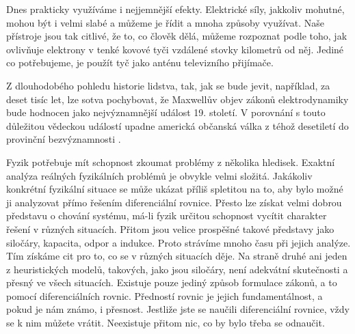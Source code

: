       Dnes prakticky využíváme i nejjemnější efekty. Elektrické síly, jakkoliv mohutné, mohou být i
      velmi slabé a můžeme je řídit a mnoha způsoby využívat. Naše přístroje jsou tak citlivé, že
      to, co člověk dělá, můžeme rozpoznat podle toho, jak ovlivňuje elektrony v tenké kovové tyči
      vzdálené stovky kilometrů od něj. Jediné co potřebujeme, je použít tyč jako anténu televizního
      přijímače.

      Z dlouhodobého pohledu historie lidstva, tak, jak se bude jevit, například, za deset tisíc
      let, lze sotva pochybovat, že Maxwellův objev zákonů elektrodynamiky bude hodnocen jako
      nejvýznamnější událost 19. století. V porovnání s touto důležitou vědeckou událostí upadne
      americká občanská válka z téhož desetiletí do provinční bezvýznamnosti
      \cite[s.~25]{Feynman02}.

  

    Fyzik potřebuje mít schopnost zkoumat problémy z několika hledisek. Exaktní analýza reálných
    fyzikálních problémů je obvykle velmi složitá. Jakákoliv konkrétní fyzikální situace se může
    ukázat příliš spletitou na to, aby bylo možné ji analyzovat přímo řešením diferenciální rovnice.
    Přesto lze získat velmi dobrou představu o chování systému, má-li fyzik určitou schopnost
    vycítit charakter řešení v různých situacích. Přitom jsou velice prospěšné takové představy jako
    siločáry, kapacita, odpor a indukce. Proto strávíme mnoho času při jejich analýze. Tím získáme
    cit pro to, co se v různých situacích děje. Na straně druhé ani jeden z heuristických modelů,
    takových, jako jsou siločáry, není adekvátní skutečnosti a přesný ve všech situacích. Existuje
    pouze jediný způsob formulace zákonů, a to pomocí diferenciálních rovnic. Předností rovnic je
    jejich fundamentálnost, a pokud je nám známo, i přesnost. Jestliže jste se naučili diferenciální
    rovnice, vždy se k nim můžete vrátit. Neexistuje přitom nic, co by bylo třeba se odnaučit.
    
